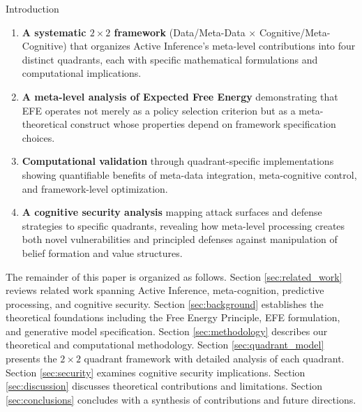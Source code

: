 \documentclass[
  ignorenonframetext,
]{beamer}
\begin{document}
\begin{frame}{Introduction}
\begin{enumerate}
\item
  \textbf{A systematic \(2 \times 2\) framework} (Data/Meta-Data
  \(\times\) Cognitive/Meta-Cognitive) that organizes Active Inference's
  meta-level contributions into four distinct quadrants, each with
  specific mathematical formulations and computational implications.
\item
  \textbf{A meta-level analysis of Expected Free Energy} demonstrating
  that EFE operates not merely as a policy selection criterion but as a
  meta-theoretical construct whose properties depend on framework
  specification choices.
\item
  \textbf{Computational validation} through quadrant-specific
  implementations showing quantifiable benefits of meta-data
  integration, meta-cognitive control, and framework-level optimization.
\item
  \textbf{A cognitive security analysis} mapping attack surfaces and
  defense strategies to specific quadrants, revealing how meta-level
  processing creates both novel vulnerabilities and principled defenses
  against manipulation of belief formation and value structures.
\end{enumerate}

The remainder of this paper is organized as follows. Section
\ref{sec:related_work} reviews related work spanning Active Inference,
meta-cognition, predictive processing, and cognitive security. Section
\ref{sec:background} establishes the theoretical foundations including
the Free Energy Principle, EFE formulation, and generative model
specification. Section \ref{sec:methodology} describes our theoretical
and computational methodology. Section \ref{sec:quadrant_model} presents
the \(2 \times 2\) quadrant framework with detailed analysis of each
quadrant. Section \ref{sec:security} examines cognitive security
implications. Section \ref{sec:discussion} discusses theoretical
contributions and limitations. Section \ref{sec:conclusions} concludes
with a synthesis of contributions and future directions.
\end{frame}
\end{document}
